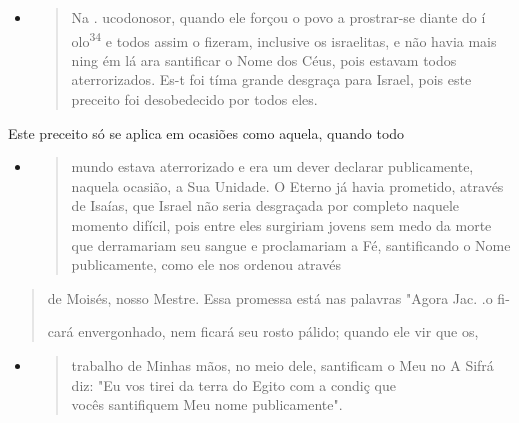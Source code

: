 \begin{itemize}
\item
 \begin{quote}
 Na . ucodonosor, quando ele forçou o povo a prostrar-se diante do í
 olo\textsuperscript{34} e todos assim o fizeram, inclusive os
 israelitas, e não havia mais nin­g ém lá ara santificar o Nome dos
 Céus, pois estavam todos aterrorizados. Es-t foi tíma grande desgraça
 para Israel, pois este preceito foi desobedecido por todos eles.
 \end{quote}
\end{itemize}

Este preceito só se aplica em ocasiões como aquela, quando todo

\begin{itemize}
\item
 \begin{quote}
 mundo estava aterrorizado e era um dever declarar publicamente,
 naquela ocasião, a Sua Unidade. O Eterno já havia prometido, através
 de Isaías, que Is­rael não seria desgraçada por completo naquele
 momento difícil, pois entre eles surgiriam jovens sem medo da morte
 que derramariam seu sangue e proclama­riam a Fé, santificando o Nome
 publicamente, como ele nos ordenou através
 \end{quote}
\end{itemize}

\begin{quote}
de Moisés, nosso Mestre. Essa promessa está nas palavras "Agora Jac.
.o fi-

cará envergonhado, nem ficará seu rosto pálido; quando ele vir que os,
\end{quote}

\begin{itemize}
\item
 \begin{quote}
 trabalho de Minhas mãos, no meio dele, santificam o Meu no A Sifrá
 diz: "Eu vos tirei da terra do Egito com a condiç que\\
 vocês santifiquem Meu nome publicamente".
 \end{quote}
\end{itemize}

